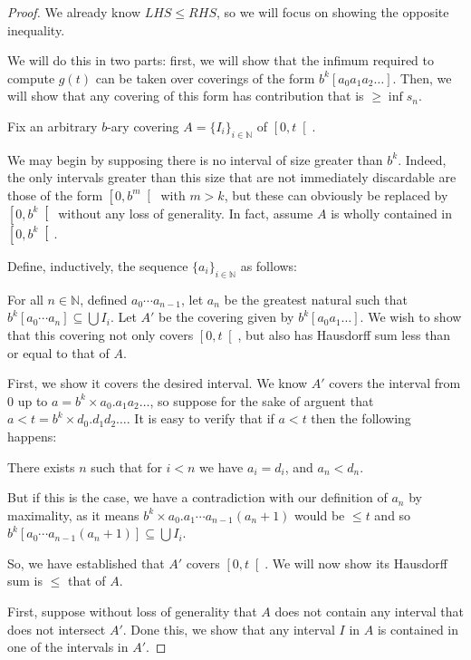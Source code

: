 \documentclass[11pt, reqno]{amsart}
\newcommand{\N}{\mathbb{N}}
\begin{document}
\begin{proof}
We already know $LHS \leq RHS$, so we will focus on showing the opposite inequality.

We will do this in two parts: first, we will show that the infimum required to compute $g(t)$ can be taken over coverings of the form $b^k [a_0 a_1 a_2 \dots]$. Then, we will show that any covering of this form has contribution that is $\geq \inf s_n$.

Fix an arbitrary $b$-ary covering $A = \{ I_i \}_{i \in \N}$ of $\left[ 0, t \right[$.

We may begin by supposing there is no interval of size greater than $b^k$. Indeed, the only intervals greater than this size that are not immediately discardable are those of the form $\left[0, b^m \right[$ with $m > k$, but these can obviously be replaced by $\left[0, b^k \right[$ without any loss of generality. In fact, assume $A$ is wholly contained in $\left[0, b^k \right[$.

Define, inductively, the sequence $\{a_i\}_{i \in \N}$ as follows:

For all $n \in \N$, defined $a_0 \cdots a_{n-1}$, let $a_n$ be the greatest natural such that $b^k [a_0 \cdots a_n] \subseteq \bigcup I_i$. Let $A'$ be the covering given by $b^k [a_0 a_1 \dots]$. We wish to show that this covering not only covers $\left[0, t \right[$, but also has Hausdorff sum less than or equal to that of $A$.

First, we show it covers the desired interval. We know $A'$ covers the interval from 0 up to $a = b^k \times a_0 . a_1 a_2 \dots$, so suppose for the sake of arguent that $a < t = b^k \times d_0 . d_1 d_2 \dots$. It is easy to verify that if $a < t$ then the following happens:

There exists $n$ such that for $i < n$ we have $a_i = d_i$, and $a_n < d_n$.

But if this is the case, we have a contradiction with our definition of $a_n$ by maximality, as it means $b^k \times a_0 . a_1 \cdots a_{n-1} (a_n + 1)$ would be $\leq t$ and so $b^k [a_0 \cdots a_{n-1} (a_n + 1)] \subseteq \bigcup I_i$.

So, we have established that $A'$ covers $\left[0, t\right[$. We will now show its Hausdorff sum is $\leq$ that of $A$.

First, suppose without loss of generality that $A$ does not contain any interval that does not intersect $A'$. Done this, we show that any interval $I$ in $A$ is contained in one of the intervals in $A'$.


\end{proof}
\end{document}
